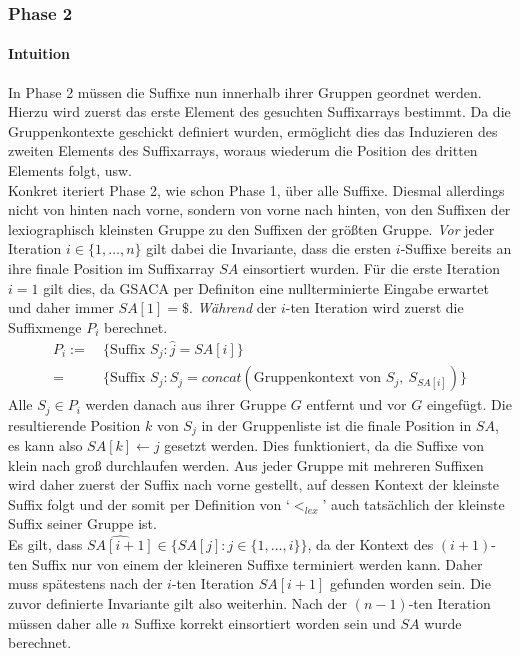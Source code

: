 \documentclass[twoside,a4paper,11pt]{article}
\theoremstyle{break}
\begin{document}
\subsubsection{Phase 2}

\paragraph{Intuition} In Phase 2 müssen die Suffixe nun innerhalb ihrer Gruppen geordnet werden. Hierzu wird zuerst das erste Element des gesuchten Suffixarrays bestimmt. Da die Gruppenkontexte geschickt definiert wurden, ermöglicht dies das Induzieren des zweiten Elements des Suffixarrays, woraus wiederum die Position des dritten Elements folgt, usw. \\

Konkret iteriert Phase 2, wie schon Phase 1, über alle Suffixe. Diesmal allerdings nicht von hinten nach vorne, sondern von vorne nach hinten, von den Suffixen der lexiographisch kleinsten Gruppe zu den Suffixen der größten Gruppe. \textit{Vor} jeder Iteration $i \in \{ 1, \dots, n \}$ gilt dabei die Invariante, dass die ersten $i$-Suffixe bereits an ihre finale Position im Suffixarray $SA$ einsortiert wurden. Für die erste Iteration $i = 1$ gilt dies, da GSACA per Definiton eine nullterminierte Eingabe erwartet und daher immer $SA[1] = \$$. \textit{Während} der $i$-ten Iteration wird zuerst die Suffixmenge $P_i$ berechnet.
\begin{align*}
	P_i :=\ & \{ \text{Suffix } S_j: \widehat{j} = SA[i] \} \\
	=\ & \{ \text{Suffix } S_j: S_j = concat(\text{Gruppenkontext von } S_j,\ S_{SA[i]}) \}
\end{align*}
Alle $S_j \in P_i$ werden danach aus ihrer Gruppe $G$ entfernt und vor $G$ eingefügt. Die resultierende Position $k$ von $S_j$ in der Gruppenliste ist die finale Position in $SA$, es kann also $SA[k] \leftarrow j$ gesetzt werden. Dies funktioniert, da die Suffixe von klein nach groß durchlaufen werden. Aus jeder Gruppe mit mehreren Suffixen wird daher zuerst der Suffix nach vorne gestellt, auf dessen Kontext der kleinste Suffix folgt und der somit per Definition von `$<_{lex}$' auch tatsächlich der kleinste Suffix seiner Gruppe ist. \\

Es gilt, dass $\widehat{SA[i + 1]} \in \{ SA[j]: j \in \{ 1, \dots, i \} \}$, da der Kontext des $(i + 1)$-ten Suffix nur von einem der kleineren Suffixe terminiert werden kann. Daher muss spätestens nach der $i$-ten Iteration $SA[i + 1]$ gefunden worden sein. Die zuvor definierte Invariante gilt also weiterhin. Nach der $(n - 1)$-ten Iteration müssen daher alle $n$ Suffixe korrekt einsortiert worden sein und $SA$ wurde berechnet.
\end{document}
